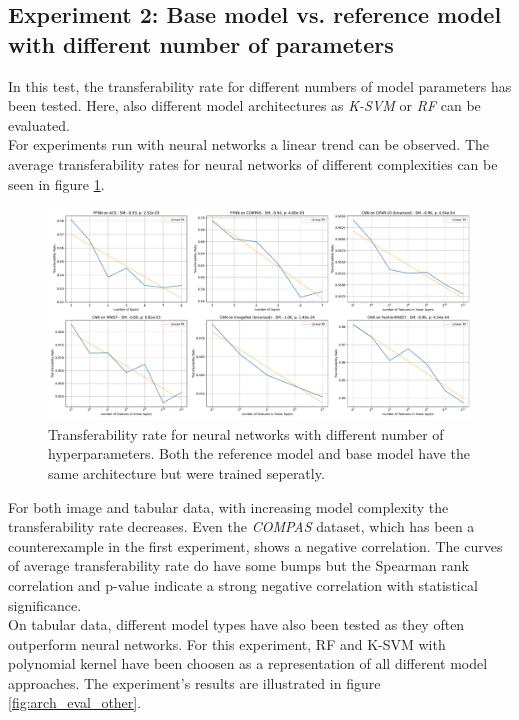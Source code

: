 \documentclass{article}
\begin{document}
\subsection{Experiment 2: Base model vs. reference model with different number of parameters}
In this test, the transferability rate for different numbers of model parameters has been tested. Here, also different model architectures as \textit{K-SVM} or \textit{RF} can be evaluated. \\
For experiments run with neural networks a linear trend can be observed. The average transferability rates for neural networks of different complexities can be seen in figure \ref{fig:arch_eval_nns}. \\
\begin{figure}[h]
    \centering
    \includegraphics[width=\linewidth]{abb/architecture_evaluation_nns.pdf}
    \caption{Transferability rate for neural networks with different number of hyperparameters. Both the reference model and base model have the same architecture but were trained seperatly.}
    \label{fig:arch_eval_nns}
\end{figure}
\noindent
For both image and tabular data, with increasing model complexity the transferability rate decreases. Even the \textit{COMPAS} dataset, which has been a counterexample in the first experiment, shows a negative correlation. The curves of average transferability rate do have some bumps but the Spearman rank correlation and p-value indicate a strong negative correlation with statistical significance.\\
On tabular data, different model types have also been tested as they often outperform neural networks. For this experiment, RF and K-SVM with polynomial kernel have been choosen as a representation of all different model approaches. The experiment's results are illustrated in figure \ref{fig:arch_eval_other}.\\
\end{document}
